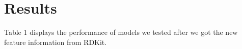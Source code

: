 \documentclass[11pt]{article}
\begin{document}
\section{Results}
Table 1 displays the performance of models we tested after we got the new feature information from RDKit. 

\end{document}
